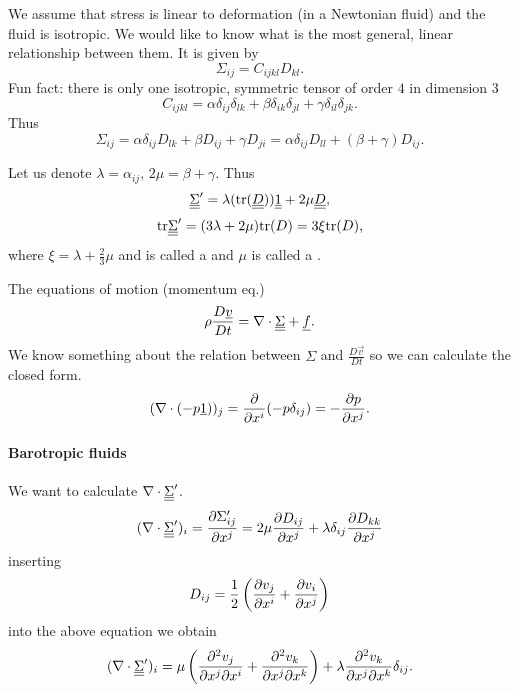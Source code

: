 \documentclass[../main.tex]{subfiles}
\begin{document}
  We assume that stress is linear to deformation (in a Newtonian fluid) and the fluid is isotropic.
  We would like to know what is the most general, linear relationship between them.
  It is given by
  \begin{displaymath}
    \Sigma_{ij} = C_{ijkl} D_{kl}.
  \end{displaymath}
  Fun fact: there is only one isotropic, symmetric tensor of order $4$ in dimension $3$
  \begin{displaymath}
    C_{ijkl} = \alpha \delta_{ij} \delta_{lk} + \beta \delta_{ik}\delta_{jl} + \gamma \delta_{il} \delta_{jk}.
  \end{displaymath}
  Thus
  \begin{displaymath}
    \Sigma_{ij} = \alpha \delta_{ij} D_{lk} + \beta D_{ij} + \gamma D_{ji} = \alpha \delta_{ij} D_{ll} + (\beta + \gamma) D_{ij}.
  \end{displaymath}
  
  Let us denote $\lambda = \alpha _{ij}$, $2 \mu = \beta + \gamma$. 
  Thus
  \begin{displaymath}
    \underline{\underline{{\Sigma}}}' = \lambda (\textrm{tr}( \underline{\underline{{D}}})) \underline{\underline{{1}}} + 2\mu \underline{\underline{{D}}},
  \end{displaymath}
  \begin{displaymath}
    \textrm{tr} \underline{\underline{{\Sigma}}}' = (3 \lambda + 2 \mu) \textrm{tr}(D) = 3 \xi \textrm{tr} (D),
  \end{displaymath}
  where $\xi = \lambda + \frac{2}{3} \mu$ and is called a  and $\mu$ is 
  called a .

  The equations of motion (momentum eq.)
  \begin{displaymath}
    \rho \frac{D\underline{v}}{D t} = \nabla\cdot \underline{\underline{{\Sigma}}} + \underline{f}.
  \end{displaymath}
  We know something about the relation between $\Sigma$ and $\frac{D \vec v}{Dt}$ so we can calculate the closed form.
  \begin{displaymath}
    (\nabla\cdot (- p \underline{1}))_j = \frac{\partial }{\partial x^i} (- p \delta_{ij}) = -\frac{\partial p}{\partial x^j}.
  \end{displaymath}

  \paragraph{Barotropic fluids}
  We want to calculate $\nabla\cdot \underline{\underline{{\Sigma}}}'$.
  \begin{displaymath}
    (\nabla\cdot \underline{\underline{{\Sigma}}}')_i = \frac{\partial \Sigma'_{ij}}{\partial x^j} = 2 \mu \frac{\partial D_{ij}}{\partial x^j} + \lambda \delta_{ij} \frac{\partial D_{kk}}{\partial x^j}
  \end{displaymath}
  inserting
  \begin{displaymath}
    D_{ij} = \frac{1}{2} \left( \frac{\partial v_j}{\partial x^i} + \frac{\partial v_i}{\partial x^j} \right) 
  \end{displaymath}
  into the above equation we obtain
  \begin{displaymath}
    (\nabla\cdot \underline{\underline{{\Sigma}}}')_i = \mu \left( \frac{\partial^2 v_j}{\partial x^j \partial x^i} 
    + \frac{\partial^2 v_k}{\partial x^j \partial x^k}\right) + \lambda \frac{\partial^2 v_k}{\partial x^j \partial x^k} \delta_{ij}.
  \end{displaymath}
\end{document}
